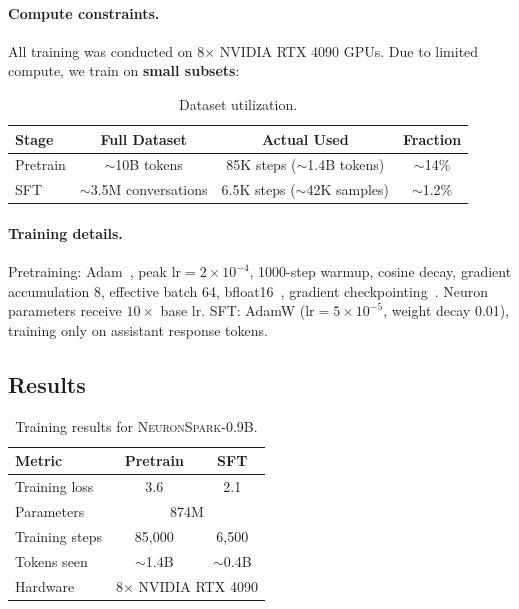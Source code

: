 \documentclass{article}
\newcommand{\model}{\textsc{NeuronSpark}}
\begin{document}
\paragraph{Compute constraints.}
All training was conducted on 8$\times$ NVIDIA RTX 4090 GPUs.
Due to limited compute, we train on \textbf{small subsets}:

\begin{table}[H]
\centering
\small
\caption{Dataset utilization.}
\label{tab:data}
\begin{tabular}{lccc}
\toprule
\textbf{Stage} & \textbf{Full Dataset} & \textbf{Actual Used} & \textbf{Fraction} \\
\midrule
Pretrain & $\sim$10B tokens & 85K steps ($\sim$1.4B tokens) & $\sim$14\% \\
SFT & $\sim$3.5M conversations & 6.5K steps ($\sim$42K samples) & $\sim$1.2\% \\
\bottomrule
\end{tabular}
\end{table}

\paragraph{Training details.}
Pretraining: Adam~\citep{loshchilov2019decoupled}, peak lr$=2{\times}10^{-4}$, 1000-step warmup, cosine decay, gradient accumulation 8, effective batch 64, bfloat16~\citep{micikevicius2018mixed}, gradient checkpointing~\citep{chen2016training}.
Neuron parameters receive $10\times$ base lr.
SFT: AdamW (lr$=5{\times}10^{-5}$, weight decay 0.01), training only on assistant response tokens.

\subsection{Results}

\begin{table}[H]
\centering
\small
\caption{Training results for \model{}-0.9B.}
\label{tab:results}
\begin{tabular}{lcc}
\toprule
\textbf{Metric} & \textbf{Pretrain} & \textbf{SFT} \\
\midrule
Training loss & 3.6 & 2.1 \\
Parameters & \multicolumn{2}{c}{874M} \\
Training steps & 85,000 & 6,500 \\
Tokens seen & $\sim$1.4B & $\sim$0.4B \\
Hardware & \multicolumn{2}{c}{8$\times$ NVIDIA RTX 4090} \\
\bottomrule
\end{tabular}
\end{table}
\end{document}
